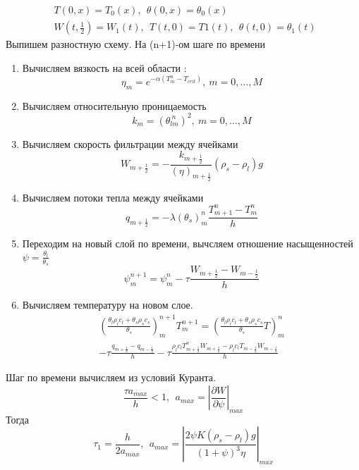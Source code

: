 \documentclass[12pt,a4paper]{article}
\newcommand{\pd}[2]{\frac{\partial #1}{\partial #2}}
\begin{document}
$$
\begin{aligned}
&T(0,x) = T_0(x), \ \ \theta(0, x) = \theta_0(x) \ \ \\
&W\left(t, \frac12\right)  = W_1(t),\ \ T(t, 0) = T1(t), \ \ \theta(t, 0) = \theta_1(t) \ \ 
\end{aligned}
$$ 
\newpage
Выпишем разностную схему. На (n+1)-ом шаге по времени 
\begin{enumerate}
\item Вычисляем вязкость на всей области : 
$$
\eta_m = e^{-\alpha(T_m^n - T_{crit})},\ m = 0, \dots ,M
$$
\item Вычисляем относительную проницаемость
$$
k_m = (\theta_{lm}^{\ n})^2 , \ m = 0,  \dots ,M
$$
\item Вычисляем скорость фильтрации между ячейками 
$$
W_{m+\frac12} = -\frac{k_{m+\frac12}}{(\eta)_{m+\frac12}}(\rho_s - \rho_l)g
$$
\item Вычисляем потоки тепла между ячейками
$$
q_{m+\frac12} = - \lambda (\theta_{s})_m^{n} \frac{T_{m+1}^n - T_m^n}{h} 
$$
\item Переходим на новый слой по времени, вычсляем отношение насыщенностей $\psi = \frac {\theta_l}{\theta_s}$
$$
\psi_m^{n+1} = \psi_m^n - \tau \frac{W_{m+\frac12} - W_{m-\frac12}}{h}
$$
\item Вычисляем температуру на новом слое. 
\begin{multline}
\left(\frac{\theta_l \rho_l c_l + \theta_s \rho_s c_s}{\theta_s}\right)_m^{n+1} T_m^{n+1} =  \left(\frac{\theta_l \rho_l c_l + \theta_s \rho_s c_s}{\theta_s} T\right)_m^n \\
- \tau\frac{q_{m+\frac12} - q_{m-\frac12}}{h} - \tau\frac{\rho_l c_l T_{m+\frac12}^n W_{m+\frac12} - \rho_l c_l T_{m-\frac12} W_{m-\frac12}}{h}
\end{multline}
\end{enumerate}

Шаг по времени вычисляем из условий Куранта. 
$$
\frac{\tau a_{max}}{h} < 1,\ \ a_{max} = \left|\pd{W}{\psi}\right|_{max}
$$
Тогда
$$
\tau_1 = \frac{h}{2 a_{max}},\ \  a_{max} = \left|\frac{2 \psi K(\rho_s - \rho_l)g}{(1+\psi)^3 \eta}\right|_{max}
$$
\end{document}

